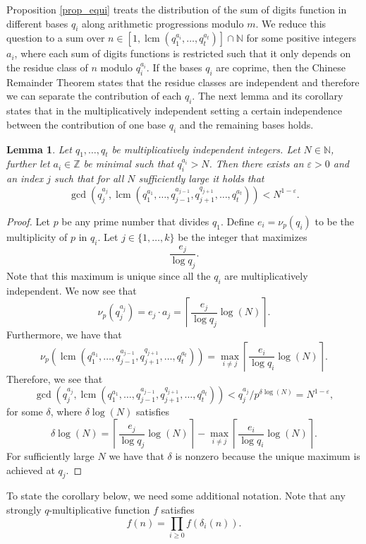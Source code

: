 \documentclass[12pt]{amsart}
\renewcommand{\geq}{\geqslant}
\DeclareMathOperator{\lcm}{lcm}
\newtheorem{lemma}[theorem]{Lemma}
\theoremstyle{definition}
\numberwithin{equation}{section}
\newcommand\ZZ{\mathbb{Z}}
\newcommand\NN{\mathbb{N}}
\numberwithin{equation}{section}
\begin{document}
Proposition \ref{prop_equi} treats the distribution of the sum of digits function in different bases $q_i$ along arithmetic progressions modulo $m$. We reduce this question to a sum over $n\in [1,\lcm(q_1^{a_i},\dots, q_t^{a_t})]\cap \NN$ for some positive integers $a_i$, where each sum of digits functions is restricted such that it only depends on the residue class of $n$ modulo $q_i^{a_i}$. If the bases $q_i$ are coprime, then the Chinese Remainder Theorem states that the residue classes are independent and therefore we can separate the contribution of each $q_i$. The next lemma and its corollary states that in the multiplicatively independent setting a certain independence between the contribution of one base $q_i$ and the remaining bases holds.
\begin{lemma} \label{small_gcd}
	Let $q_1,\dots,q_t$ be multiplicatively independent integers. Let $N\in \NN$, further let $a_i\in \ZZ$ be minimal such that $q_i^{a_i}>N$. Then there exists an $\varepsilon>0$ and an index $j$ such that for all $N$ sufficiently large it holds that
	\[
		\gcd(q_j^{a_j}, \lcm(q_1^{a_1},\dots, q_{j-1}^{a_{j-1}}, q_{j+1}^{q_{j+1}}, \dots,q_t^{a_t}))<N^{1-\varepsilon}.
	\]
\end{lemma}
\begin{proof}
	Let $p$ be any prime number that divides $q_1$. Define $e_i=\nu_p(q_i)$ to be the multiplicity of $p$ in $q_i$. Let $j\in \{1,\dots,k\}$ be the integer that maximizes
	\[
		\frac{e_j}{\log q_j}.
	\]
	Note that this maximum is unique since all the $q_i$ are multiplicatively independent. We now see that 
	\[
		\nu_p(q_j^{a_j}) = e_j\cdot a_j  = \left\lceil\frac{e_j}{\log q_j}\log(N)\right\rceil.
	\]
	Furthermore, we have that
	\[
		\nu_p(\lcm(q_1^{a_1},\dots, q_{j-1}^{a_{j-1}}, q_{j+1}^{q_{j+1}}, \dots,q_t^{a_t})) = \max_{i\neq j} \left\lceil\frac{e_i}{\log q_i}\log(N)\right\rceil.
	\]
	Therefore, we see that
	\[
		\gcd(q_j^{a_j}, \lcm(q_1^{a_1},\dots, q_{j-1}^{a_{j-1}}, q_{j+1}^{q_{j+1}}, \dots,q_t^{a_t})) < 
		q_j^{a_j}/p^{\delta \log(N)} = N^{1-\varepsilon},
	\]
	for some $\delta$, where $\delta \log(N)$ satisfies
	\[
		\delta \log(N) = \left\lceil\frac{e_j}{\log q_j}\log(N)\right\rceil-\max_{i\neq j} \left\lceil\frac{e_i}{\log q_i}\log(N)\right\rceil.
	\]
	For sufficiently large $N$ we have that $\delta$ is nonzero because the unique maximum is achieved at $q_j$.
\end{proof}
To state the corollary below, we need some additional notation. Note that any strongly $q$-multiplicative function $f$ satisfies
\[
	f(n)= \prod_{i\geq 0}f(\delta_i(n)).
\]
\end{document}
